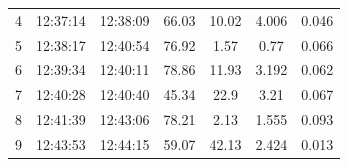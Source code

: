 \begin{table}[h!]
{\begin{tabular}{ccccccc}
4                                                  & 12:37:14                                                  & 12:38:09                                                & 66.03                                                           & 10.02                                                         & 4.006                                                                   & 0.046                                                           \\
5                                                  & 12:38:17                                                  & 12:40:54                                                & 76.92                                                           & 1.57                                                          & 0.77                                                                    & 0.066                                                           \\
6                                                  & 12:39:34                                                  & 12:40:11                                                & 78.86                                                           & 11.93                                                         & 3.192                                                                   & 0.062                                                           \\
7                                                  & 12:40:28                                                  & 12:40:40                                                & 45.34                                                           & 22.9                                                          & 3.21                                                                    & 0.067                                                           \\
8                                                  & 12:41:39                                                  & 12:43:06                                                & 78.21                                                           & 2.13                                                          & 1.555                                                                   & 0.093                                                           \\
9                                                  & 12:43:53                                                  & 12:44:15                                                & 59.07                                                           & 42.13                                                         & 2.424                                                                   & 0.013                                                           \\ \hline
\end{tabular}%
}
\end{table}

